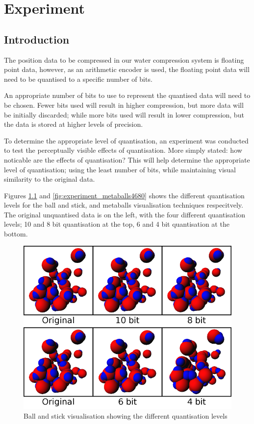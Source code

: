 \graphicspath{{./experiment/}}

\chapter{Experiment}
\label{cha:experiment}

\section{Introduction}
\label{sec:experiment_introduction}


The position data to be compressed in our water compression system is floating
point data, however, as an arithmetic encoder is used, the floating point data
will need to be quantised to a specific number of bits.

An appropriate number of bits to use to represent the quantised data will need
to be chosen. Fewer bits used will result in higher compression, but more data
will be initially discarded; while more bits used will result in lower
compression, but the data is stored at higher levels of precision.

To determine the appropriate level of quantisation, an experiment was conducted
to test the perceptually visible effects of quantisation. More simply stated:
how noticable are the effects of quantisation? This will help determine the
appropriate level of quantisation; using the least number of bits, while
maintaining visual similarity to the original data.

Figures \ref{fig:experiment_ballstick4680} and
\ref{fig:experiment_metaballs4680} shows the different quantisation levels for
the ball and stick, and metaballs visualisation techniques respecitvely. The
original unquantised data is on the left, with the four different quantisation
levels; 10 and 8 bit quantisation at the top, 6 and 4 bit quantisation at the
bottom.

\begin{figure}[h!]
  \begin{center}
    \includegraphics[width=120mm]{ballstick4680}
  \end{center}
  \caption{Ball and stick visualisation showing the different quantisation
  levels}
  \label{fig:experiment_ballstick4680}
\end{figure}


